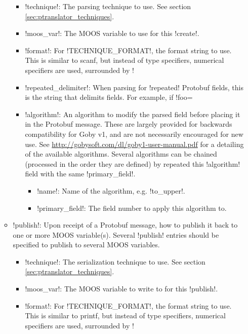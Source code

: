 \begin{itemize}
\begin{itemize}
\begin{itemize}
\item !technique!: The parsing technique to use. See section \ref{sec:ptranslator_techniques}.
\item !moos_var!: The MOOS variable to use for this !create!. 
\item !format!: For !TECHNIQUE_FORMAT!, the format string to use. This is similar to scanf, but instead of type specifiers, numerical specifiers are used, surrounded by !%
\item !repeated_delimiter!: When parsing for !repeated! Protobuf fields, this is the string that delimits fields. For example, if !foo=%
\item !algorithm!: An algorithm to modify the parsed field before placing it in the Protobuf message. These are largely provided for backwards compatibility for Goby v1, and are not necessarily encouraged for new use. See \url{http://gobysoft.com/dl/goby1-user-manual.pdf} for a detailing of the available algorithms. Several algorithms can be chained (processed in the order they are defined) by repeated this !algorithm! field with the same !primary_field!.
\begin{itemize}
\item !name!: Name of the algorithm, e.g. !to_upper!.
\item !primary_field!: The field number to apply this algorithm to. 
\end{itemize}
\end{itemize}
\item !publish!: Upon receipt of a Protobuf message, how to publish it back to one or more MOOS variable(s). Several !publish! entries should be specified to publish to several MOOS variables.
\begin{itemize}
\item !technique!: The serialization technique to use. See section \ref{sec:ptranslator_techniques}.
\item !moos_var!: The MOOS variable to write to for this !publish!. 
\item !format!: For !TECHNIQUE_FORMAT!, the format string to use. This is similar to printf, but instead of type specifiers, numerical specifiers are used, surrounded by !%

\end{itemize}
\end{itemize}
\end{itemize}
